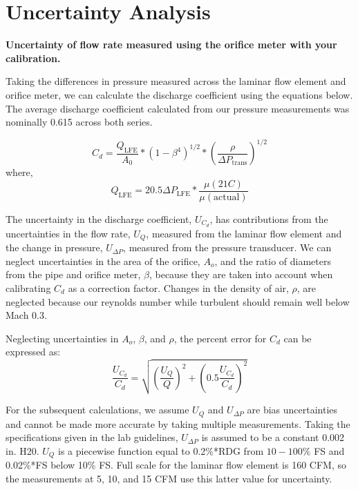 \documentclass{article}
\begin{document}
\newpage
\section{Uncertainty Analysis}

\textbf{Uncertainty of flow rate measured using the orifice meter with
your calibration.} 

Taking the differences in pressure measured across the laminar flow element and orifice meter, 
we can calculate the discharge coefficient using the equations below. The average discharge coefficient 
calculated from our pressure measurements was nominally 0.615 across both series.

\begin{equation}
  C_d = \frac{Q_{\text{LFE}} }{A_0} * (1-\beta^4)^{1/2} * \left(\frac{\rho}{\Delta P_{\text{trans}}}\right)^{1/2}
\end{equation}
where, 
\begin{equation}
  Q_{\text{LFE}} = 20.5 \Delta P_{\text{LFE}} * \frac{\mu(21 C)}{\mu(\text{actual})}
\end{equation}

The uncertainty in the discharge coefficient, $U_{C_d}$, has contributions from the uncertainties in
the flow rate, $U_Q$, measured from the laminar flow element and the change in pressure, $U_{\Delta P}$, 
measured from the pressure transducer. We can neglect uncertainties in the area of the orifice, $A_o$, 
and the ratio of diameters from the pipe and orifice meter, $\beta$, because they are taken into account 
when calibrating $C_d$ as a correction factor. Changes in the density of air, $\rho$, are neglected because our 
reynolds number while turbulent should remain well below Mach 0.3.

Neglecting uncertainties in $A_o$, $\beta$, and $\rho$, the percent error for $C_d$ can be expressed as:
\begin{equation}
  \frac{U_{C_d}}{C_d} = \sqrt{ \left(\frac{U_{Q}}{Q}\right)^2 + \left( 0.5 \frac{U_{C_d}}{C_d} \right)^2}
\end{equation}

For the subsequent calculations, we assume $U_Q$ and $U_{\Delta P}$ are bias uncertainties and cannot be 
made more accurate by taking multiple measurements. Taking the specifications given in the lab 
guidelines, $U_{\Delta P}$ is assumed to be a constant 0.002 in. H20. $U_Q$ is a piecewise function equal to 
0.2\%*RDG from $10-100\%$ FS and 0.02\%*FS below 10\% FS. Full scale for the laminar flow element is 160 
CFM, so the measurements at 5, 10, and 15 CFM use this latter value for uncertainty.
\end{document}

